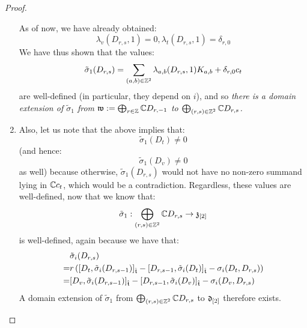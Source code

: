 \begin{proof}
\begin{enumerate}
                    As of now, we have already obtained:
                        $$\lambda_v(D_{r, s}, 1) = 0, \lambda_t(D_{r, s}, 1) = \delta_{r, 0}$$
                    We have thus shown that the values:
                        $$\tilde{\sigma}_1(D_{r, s}) = \sum_{(a, b) \in \mathbb{Z}^2} \lambda_{a, b}(D_{r, s}, 1) K_{a, b} + \delta_{r, 0} c_t$$
                    are well-defined (in particular, they depend on $i$), and so \textit{there is a domain extension of $\tilde{\sigma}_1$ from $\mathfrak{w} := \bigoplus_{r \in \mathbb{Z}} \mathbb{C} D_{r, -1}$ to $\bigoplus_{(r, s) \in \mathbb{Z}^2} \mathbb{C} D_{r, s}$.}
                    \item Also, let us note that the above implies that:
                        $$\tilde{\sigma}_1(D_t) \not = 0$$
                    (and hence:
                        $$\tilde{\sigma}_1(D_v) \not = 0$$
                    as well) because otherwise, $\tilde{\sigma}_1(D_{r, s})$ would not have no non-zero summand lying in $\mathbb{C} c_t$, which would be a contradiction. Regardless, these values are well-defined, now that we know that:
                        $$\tilde{\sigma}_1: \bigoplus_{(r, s) \in \mathbb{Z}^2} \mathbb{C} D_{r, s} \to \mathfrak{z}_{[2]}$$
                    is well-defined, again because we have that:
                        $$
                            \begin{aligned}
                                & \tilde{\sigma}_i(D_{r, s})
                                \\
                                = & r\left( [D_t, \tilde{\sigma}_i(D_{r, s - 1})]_{\hat{\mathfrak{t}}} - [D_{r, s - 1}, \tilde{\sigma}_i(D_t)]_{\hat{\mathfrak{t}}} - \sigma_i(D_t, D_{r, s}) \right)
                                \\
                                = & [D_v, \tilde{\sigma}_i(D_{r, s - 1})]_{\hat{\mathfrak{t}}} - [D_{r, s - 1}, \tilde{\sigma}_i(D_v)]_{\hat{\mathfrak{t}}} - \sigma_i(D_v, D_{r, s})
                            \end{aligned}
                        $$
                    A domain extension of $\tilde{\sigma}_1$ from $\bigoplus_{(r, s) \in \mathbb{Z}^2} \mathbb{C} D_{r, s}$ to $\mathfrak{d}_{[2]}$ therefore exists.
                \end{enumerate}
            \end{proof}
    
    \printbibliography

